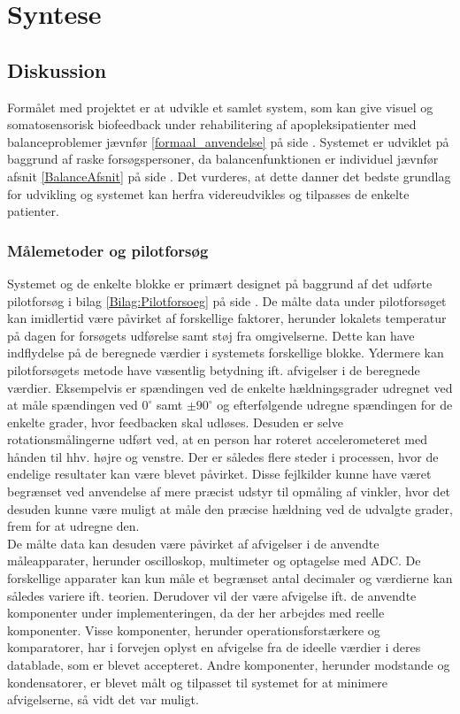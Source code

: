 \chapter{Syntese}
\section{Diskussion}
Formålet med projektet er at udvikle et samlet system, som kan give visuel og somatosensorisk biofeedback under rehabilitering af apopleksipatienter med balanceproblemer jævnfør \ref{formaal_anvendelse} på side \pageref{formaal_anvendelse}. Systemet er udviklet på baggrund af raske forsøgspersoner, da balancenfunktionen er individuel jævnfør afsnit \ref{BalanceAfsnit} på side \pageref{BalanceAfsnit}. Det vurderes, at dette danner det bedste grundlag for udvikling og systemet kan herfra videreudvikles og tilpasses de enkelte patienter. 

\subsection{Målemetoder og pilotforsøg}
Systemet og de enkelte blokke er primært designet på baggrund af det udførte pilotforsøg i bilag \ref{Bilag:Pilotforsoeg} på side \pageref{Bilag:Pilotforsoeg}. De målte data under pilotforsøget kan imidlertid være påvirket af forskellige faktorer, herunder lokalets temperatur på dagen for forsøgets udførelse samt støj fra omgivelserne. Dette kan have indflydelse på de beregnede værdier i systemets forskellige blokke.
Ydermere kan pilotforsøgets metode have væsentlig betydning ift. afvigelser i de beregnede værdier. Eksempelvis er spændingen ved de enkelte hældningsgrader udregnet ved at måle spændingen ved $0^{\circ}$ samt $\pm90^{\circ}$ og efterfølgende udregne spændingen for de enkelte grader, hvor feedbacken skal udløses. Desuden er selve rotationsmålingerne udført ved, at en person har roteret accelerometeret med hånden til hhv. højre og venstre. Der er således flere steder i processen, hvor de endelige resultater kan være blevet påvirket. Disse fejlkilder kunne have været begrænset ved anvendelse af mere præcist udstyr til opmåling af vinkler, hvor det desuden kunne være muligt at måle den præcise hældning ved de udvalgte grader, frem for at udregne den.  \\
De målte data kan desuden være påvirket af afvigelser i de anvendte måleapparater, herunder oscilloskop, multimeter og optagelse med ADC. De forskellige apparater kan kun måle et begrænset antal decimaler og værdierne kan således variere ift. teorien. Derudover vil der være afvigelse ift. de anvendte komponenter under implementeringen, da der her arbejdes med reelle komponenter. Visse komponenter, herunder operationsforstærkere og komparatorer, har i forvejen oplyst en afvigelse fra de ideelle værdier i deres datablade, som er blevet accepteret. Andre komponenter, herunder modstande og kondensatorer, er blevet målt og tilpasset til systemet for at minimere afvigelserne, så vidt det var muligt. 

